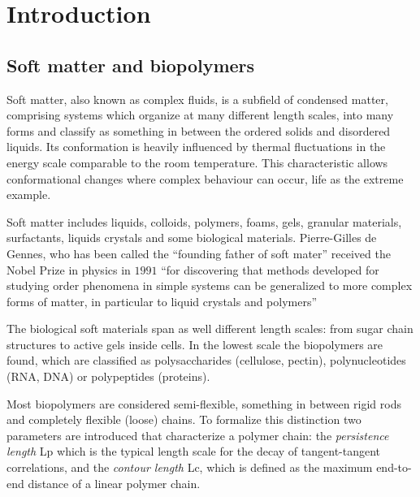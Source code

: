 
\chapter{Introduction} %

\label{Introduction} %

\section{Soft matter and biopolymers}
Soft matter, also known as complex fluids, is a subfield of condensed
matter, comprising systems which organize at many different length scales, into
many forms and classify as something in between the
ordered solids and disordered liquids. Its conformation is heavily
influenced by thermal fluctuations in the energy scale comparable to the room
temperature. This characteristic allows conformational changes where complex
behaviour can occur, life as the extreme example.


Soft matter includes liquids, colloids, polymers, foams, gels, granular
materials, surfactants, liquids crystals and some biological materials.
Pierre-Gilles de Gennes, who has been called the ``founding father of soft
mater'' received the Nobel Prize in physics in $1991$ ``for discovering that
methods developed for studying order phenomena in simple systems can be
generalized to more complex forms of matter, in particular to liquid  crystals
and polymers''\citep{de_gennes_pierre-gilles_????}

The biological soft materials span as well different length scales: from sugar
chain structures to active gels inside cells. In the
lowest scale the biopolymers are found, which are classified as polysaccharides
(cellulose, pectin),  polynucleotides (RNA, DNA) or polypeptides (proteins).

Most biopolymers are considered semi-flexible, something in between
rigid rods and completely flexible (loose) chains.  To formalize this
distinction two parameters are introduced that characterize a polymer
chain: the \emph{persistence length} \gls{Lp} which is the typical length scale
for the decay of tangent-tangent correlations, and the \emph{contour length}
\gls{Lc}, which is defined as the maximum end-to-end distance of a linear
polymer chain.

